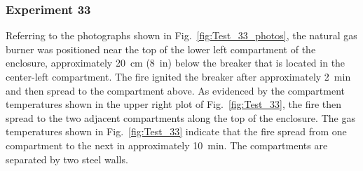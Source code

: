 \documentclass[12pt]{article}
\begin{document}
\clearpage

\subsubsection{Experiment 33}

Referring to the photographs shown in Fig.~\ref{fig:Test_33_photos}, the natural gas burner was positioned near the top of the lower left compartment of the enclosure, approximately 20~cm (8~in) below the breaker that is located in the center-left compartment. The fire ignited the breaker after approximately 2~min and then spread to the compartment above. As evidenced by the compartment temperatures shown in the upper right plot of Fig.~\ref{fig:Test_33}, the fire then spread to the two adjacent compartments along the top of the enclosure. The gas temperatures shown in Fig.~\ref{fig:Test_33} indicate that the fire spread from one compartment to the next in approximately 10~min. The compartments are separated by two steel walls.
\end{document}

